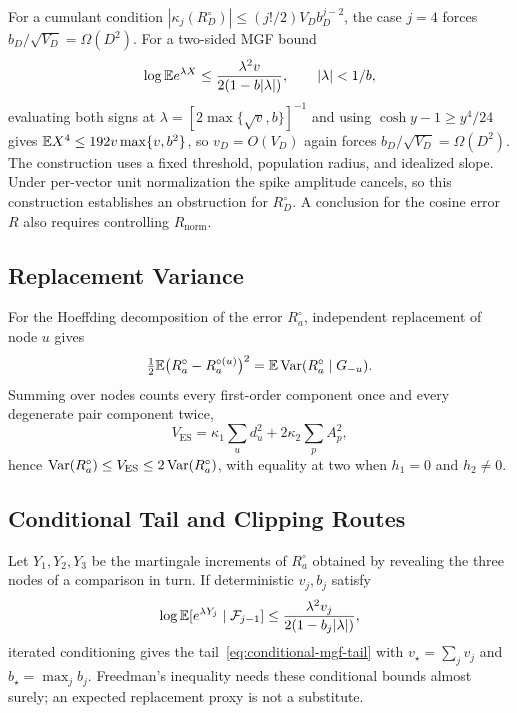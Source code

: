 For a cumulant condition $|\kappa_j(R_D^\circ)|\le(j!/2)V_Db_D^{j-2}$, the case $j=4$ forces $b_D/\sqrt{V_D}=\Omega(D^2)$. For a two-sided MGF bound
\begin{equation}
\log\mathbb{E} e^{\lambda X}\le\frac{\lambda^2v}{2(1-b|\lambda|)},\qquad|\lambda|<1/b,
\end{equation}
evaluating both signs at $\lambda=[2\max\{\sqrt v,b\}]^{-1}$ and using $\cosh y-1\ge y^4/24$ gives $\mathbb{E} X^4\le192v\max\{v,b^2\}$, so $v_D=O(V_D)$ again forces $b_D/\sqrt{V_D}=\Omega(D^2)$. The construction uses a fixed threshold, population radius, and idealized slope. Under per-vector unit normalization the spike amplitude cancels, so this construction establishes an obstruction for $R_D^\circ$. A conclusion for the cosine error $R$ also requires controlling $R_{\mathrm{norm}}$.

\subsection{Replacement Variance}

For the Hoeffding decomposition of the error $R_a^\circ$, independent replacement of node $u$ gives
\begin{equation}
\tfrac12\mathbb{E}\bigl(R_a^\circ-R_a^{\circ(u)}\bigr)^2=\mathbb{E}\operatorname{Var}(R_a^\circ\mid G_{-u}).
\end{equation}
Summing over nodes counts every first-order component once and every degenerate pair component twice,
\begin{equation}
V_{\mathrm{ES}}=\kappa_1\sum_ud_u^2+2\kappa_2\sum_pA_p^2,
\end{equation}
hence $\operatorname{Var}(R_a^\circ)\le V_{\mathrm{ES}}\le2\operatorname{Var}(R_a^\circ)$, with equality at two when $h_1=0$ and $h_2\ne0$.

\subsection{Conditional Tail and Clipping Routes}

Let $Y_1,Y_2,Y_3$ be the martingale increments of $R_a^\circ$ obtained by revealing the three nodes of a comparison in turn. If deterministic $v_j,b_j$ satisfy
\begin{equation}
\log\mathbb{E}[e^{\lambda Y_j}\mid\mathcal F_{j-1}]\le\frac{\lambda^2v_j}{2(1-b_j|\lambda|)},
\end{equation}
iterated conditioning gives the tail~\eqref{eq:conditional-mgf-tail} with $v_\star=\sum_jv_j$ and $b_\star=\max_jb_j$. Freedman's inequality needs these conditional bounds almost surely; an expected replacement proxy is not a substitute.

